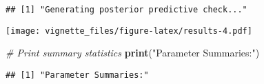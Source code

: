 \documentclass[
]{article}
\newenvironment{Shaded}{\begin{snugshade}}{\end{snugshade}}
\newcommand{\CommentTok}[1]{\textcolor[rgb]{0.56,0.35,0.01}{\textit{#1}}}
\newcommand{\FunctionTok}[1]{\textcolor[rgb]{0.13,0.29,0.53}{\textbf{#1}}}
\newcommand{\NormalTok}[1]{#1}
\newcommand{\SpecialCharTok}[1]{\textcolor[rgb]{0.81,0.36,0.00}{\textbf{#1}}}
\newcommand{\StringTok}[1]{\textcolor[rgb]{0.31,0.60,0.02}{#1}}
\begin{document}
\begin{verbatim}
## [1] "Generating posterior predictive check..."
\end{verbatim}

\texttt{[image: vignette\_files/figure-latex/results-4.pdf]}

\begin{Shaded}
\begin{Highlighting}[]
\CommentTok{\# Print summary statistics}
\FunctionTok{print}\NormalTok{(}\StringTok{"Parameter Summaries:"}\NormalTok{)}
\end{Highlighting}
\end{Shaded}

\begin{verbatim}
## [1] "Parameter Summaries:"
\end{verbatim}

\begin{Shaded}
\end{Shaded}
\end{document}
